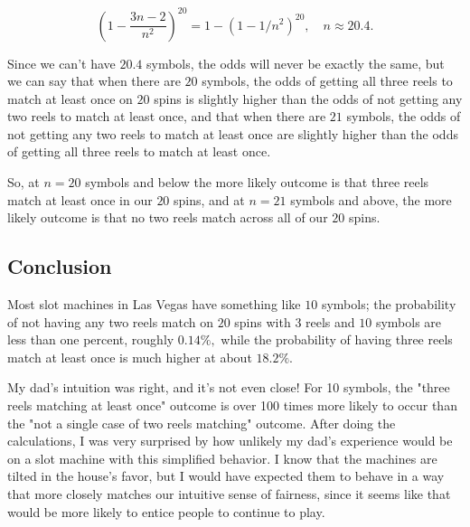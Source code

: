 \documentclass{article}
\begin{document}
 \[ (1 - \frac{3n - 2}{n^2})^{20} = 1-(1 - 1/n^2)^{20}, \quad n \approx 20.4. \]

 Since we can't have $20.4$ symbols, the \@{odds} will never be exactly the same, but we can say that when there are $20$ symbols, the odds of getting all three reels to match at least once on $20$ spins is slightly higher than the odds of not getting any two reels to match at least once, and that when there are $21$ symbols, the odds of not getting any two reels to match at least once are slightly higher than the odds of getting all three reels to match at least once.

 So, at $n=20$ symbols and below the more likely outcome is that three reels match at least once in our $20$ spins, and at $n=21$ symbols and above, the more likely outcome is that no two reels match across all of our $20$ spins. 

\subsection{Conclusion}

Most slot machines in Las Vegas have something like $10$ symbols; the \@{probability} of not having any two reels match on $20$ spins with $3$ reels and $10$ symbols are less than one percent, roughly $0.14\%,$ while the probability of having three reels match at least once is much higher at about $18.2\%.$

My dad's intuition was right, and it's not even close! For 10 symbols, the "three reels matching at least once" outcome is over 100 times more likely to occur than the "not a single case of two reels matching" outcome. After doing the calculations, I was very surprised by how unlikely my dad's experience would be on a slot machine with this simplified behavior. I know that the machines are tilted in the house's favor, but I would have expected them to behave in a way that more closely matches our intuitive sense of fairness, since it seems like that would be more likely to entice people to continue to play.
\end{document}
